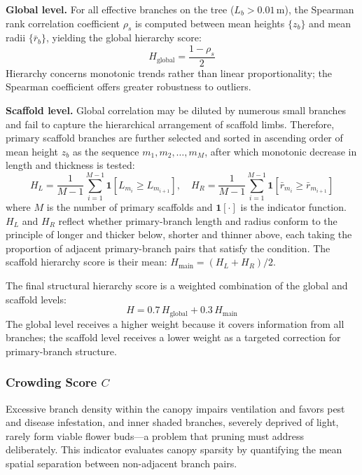 \documentclass[12pt,a4paper,fontset=fandol]{ctexart}
\newcommand{\rb}{\bar{r}_b}
\begin{document}
\textbf{Global level.}
For all effective branches on the tree ($L_b > 0.01$\,m),
the Spearman rank correlation coefficient $\rho_s$ is computed between mean heights $\{z_b\}$ and mean radii $\{\rb\}$,
yielding the global hierarchy score:
\begin{equation}\label{eq:hierarchy_global}
  H_{\text{global}} = \frac{1 - \rho_s}{2}
\end{equation}
Hierarchy concerns monotonic trends rather than linear proportionality;
the Spearman coefficient offers greater robustness to outliers.

\textbf{Scaffold level.}
Global correlation may be diluted by numerous small branches and fail to capture the hierarchical arrangement of scaffold limbs.
Therefore, primary scaffold branches are further selected
and sorted in ascending order of mean height $z_b$ as the sequence $m_1, m_2, \ldots, m_M$,
after which monotonic decrease in length and thickness is tested:
\begin{equation}\label{eq:hierarchy_main}
  H_L = \frac{1}{M-1}\sum_{i=1}^{M-1} \mathbf{1}\!\left[L_{m_i} \geq L_{m_{i+1}}\right], \quad
  H_R = \frac{1}{M-1}\sum_{i=1}^{M-1} \mathbf{1}\!\left[\bar{r}_{m_i} \geq \bar{r}_{m_{i+1}}\right]
\end{equation}
where $M$ is the number of primary scaffolds and $\mathbf{1}[\cdot]$ is the indicator function.
$H_L$ and $H_R$ reflect whether primary-branch length and radius conform to the principle of longer and thicker below, shorter and thinner above,
each taking the proportion of adjacent primary-branch pairs that satisfy the condition.
The scaffold hierarchy score is their mean: $H_{\text{main}} = (H_L + H_R) / 2$.

The final structural hierarchy score is a weighted combination of the global and scaffold levels:
\begin{equation}\label{eq:hierarchy}
  H = 0.7 \, H_{\text{global}} + 0.3 \, H_{\text{main}}
\end{equation}
The global level receives a higher weight because it covers information from all branches;
the scaffold level receives a lower weight as a targeted correction for primary-branch structure.

\subsubsection{Crowding Score $C$}

Excessive branch density within the canopy impairs ventilation and favors pest and disease infestation,
and inner shaded branches, severely deprived of light, rarely form viable flower buds---a problem that pruning must address deliberately.
This indicator evaluates canopy sparsity by quantifying the mean spatial separation between non-adjacent branch pairs.
\end{document}
